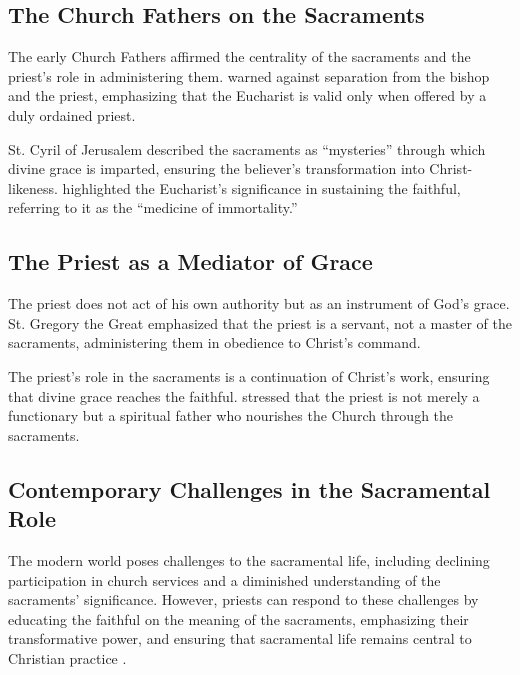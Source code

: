 \documentclass[12pt, doc]{apa7}   	%
\begin{document}
\subsection{The Church Fathers on the Sacraments}

The early Church Fathers affirmed the centrality of the sacraments and the priest’s role in administering them. \cite{epistles_ignatius} warned against separation from the bishop and the priest, emphasizing that the Eucharist is valid only when offered by a duly ordained priest. 

St. Cyril of Jerusalem \citep{early_church_akin} described the sacraments as ``mysteries'' through which divine grace is imparted, ensuring the believer’s transformation into Christ-likeness. \citet{priesthood_chrysostom,complete_work_chrysostom} highlighted the Eucharist’s significance in sustaining the faithful, referring to it as the ``medicine of immortality.''

\subsection{The Priest as a Mediator of Grace}

The priest does not act of his own authority but as an instrument of God’s grace. St. Gregory the Great \citep{early_church_akin} emphasized that the priest is a servant, not a master of the sacraments, administering them in obedience to Christ’s command.

The priest’s role in the sacraments is a continuation of Christ’s work, ensuring that divine grace reaches the faithful. \citet{priesthood_shenouda} stressed that the priest is not merely a functionary but a spiritual father who nourishes the Church through the sacraments.

\subsection{Contemporary Challenges in the Sacramental Role}

The modern world poses challenges to the sacramental life, including declining participation in church services and a diminished understanding of the sacraments’ significance. However, priests can respond to these challenges by educating the faithful on the meaning of the sacraments, emphasizing their transformative power, and ensuring that sacramental life remains central to Christian practice \citep{eucharist_schmemann}.
\end{document}
